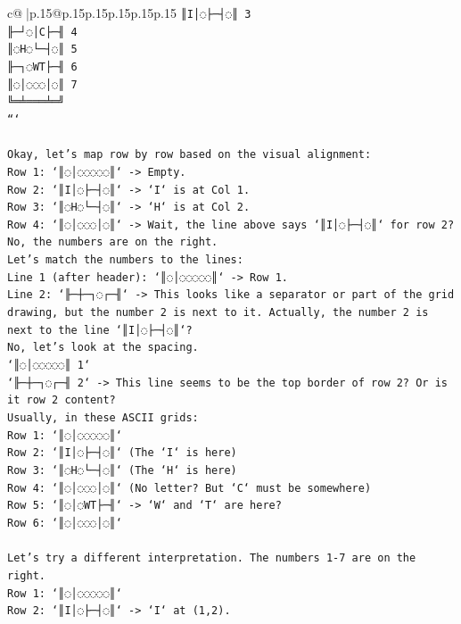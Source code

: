 \documentclass{article}
\begin{document}
{\begin{supertabular}{c@{$\;$}|p{.15\linewidth}@{}p{.15\linewidth}p{.15\linewidth}p{.15\linewidth}p{.15\linewidth}p{.15\linewidth}}
{{{\texttt{║I│◌├─┤◌║ 3} \\
\texttt{╟─┘◌│C├─╢ 4} \\
\texttt{║◌H◌└─┤◌║ 5} \\
\texttt{╟─┐◌WT├─╢ 6} \\
\texttt{║◌│◌◌◌│◌║ 7} \\
\texttt{╚═╧═══╧═╝} \\
\texttt{```} \\
\\ 
\texttt{Okay, let's map row by row based on the visual alignment:} \\
\texttt{Row 1: `║◌│◌◌◌◌◌║` {-}> Empty.} \\
\texttt{Row 2: `║I│◌├─┤◌║` {-}> `I` is at Col 1.} \\
\texttt{Row 3: `║◌H◌└─┤◌║` {-}> `H` is at Col 2.} \\
\texttt{Row 4: `║◌│◌◌◌│◌║` {-}> Wait, the line above says `║I│◌├─┤◌║` for row 2? No, the numbers are on the right.} \\
\texttt{Let's match the numbers to the lines:} \\
\texttt{Line 1 (after header): `║◌│◌◌◌◌◌║` {-}> Row 1.} \\
\texttt{Line 2: `╟─┼─┐◌┌─╢` {-}> This looks like a separator or part of the grid drawing, but the number 2 is next to it. Actually, the number 2 is next to the line `║I│◌├─┤◌║`?} \\
\texttt{No, let's look at the spacing.} \\
\texttt{`║◌│◌◌◌◌◌║ 1`} \\
\texttt{`╟─┼─┐◌┌─╢ 2` {-}> This line seems to be the top border of row 2? Or is it row 2 content?} \\
\texttt{Usually, in these ASCII grids:} \\
\texttt{Row 1: `║◌│◌◌◌◌◌║`} \\
\texttt{Row 2: `║I│◌├─┤◌║` (The `I` is here)} \\
\texttt{Row 3: `║◌H◌└─┤◌║` (The `H` is here)} \\
\texttt{Row 4: `║◌│◌◌◌│◌║` (No letter? But `C` must be somewhere)} \\
\texttt{Row 5: `║◌│◌WT├─╢` {-}> `W` and `T` are here?} \\
\texttt{Row 6: `║◌│◌◌◌│◌║`} \\
\\ 
\texttt{Let's try a different interpretation. The numbers 1{-}7 are on the right.} \\
\texttt{Row 1: `║◌│◌◌◌◌◌║`} \\
\texttt{Row 2: `║I│◌├─┤◌║` {-}> `I` at (1,2).} \\
}}}
\end{supertabular}}
\end{document}
